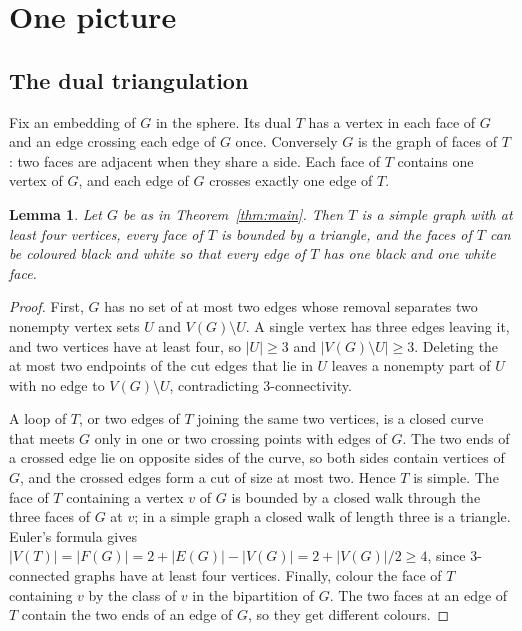 \documentclass[10pt]{amsart}
\numberwithin{equation}{section}
\newtheorem{lemma}[equation]{Lemma}
\theoremstyle{definition}
\theoremstyle{remark}
\newcommand{\T}{T}
\begin{document}
\section{One picture}\label{sec:picture}

\subsection*{The dual triangulation}
Fix an embedding of $G$ in the sphere.
Its dual $\T$ has a vertex in each face of $G$ and an edge crossing each edge of $G$ once.
Conversely $G$ is the graph of faces of $\T$: two faces are adjacent when they share a side.
Each face of $\T$ contains one vertex of $G$, and each edge of $G$ crosses exactly one edge of $\T$.

\begin{lemma}\label{lem:dual}
Let $G$ be as in Theorem~\ref{thm:main}.
Then $\T$ is a simple graph with at least four vertices, every face of $\T$ is bounded by a triangle, and the faces of $\T$ can be coloured black and white so that every edge of $\T$ has one black and one white face.
\end{lemma}

\begin{proof}
First, $G$ has no set of at most two edges whose removal separates two nonempty vertex sets $U$ and $V(G)\setminus U$.
A single vertex has three edges leaving it, and two vertices have at least four, so $|U|\ge 3$ and $|V(G)\setminus U|\ge3$.
Deleting the at most two endpoints of the cut edges that lie in $U$ leaves a nonempty part of $U$ with no edge to $V(G)\setminus U$, contradicting 3-connectivity.

A loop of $\T$, or two edges of $\T$ joining the same two vertices, is a closed curve that meets $G$ only in one or two crossing points with edges of $G$.
The two ends of a crossed edge lie on opposite sides of the curve, so both sides contain vertices of $G$, and the crossed edges form a cut of size at most two.
Hence $\T$ is simple.
The face of $\T$ containing a vertex $v$ of $G$ is bounded by a closed walk through the three faces of $G$ at $v$; in a simple graph a closed walk of length three is a triangle.
Euler's formula gives $|V(\T)|=|F(G)|=2+|E(G)|-|V(G)|=2+|V(G)|/2\ge4$, since 3-connected graphs have at least four vertices.
Finally, colour the face of $\T$ containing $v$ by the class of $v$ in the bipartition of $G$.
The two faces at an edge of $\T$ contain the two ends of an edge of $G$, so they get different colours.
\end{proof}
\end{document}
